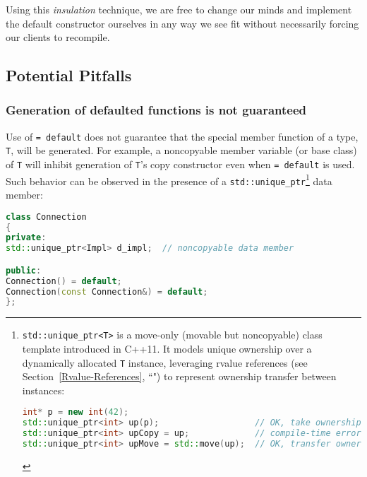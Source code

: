 \noindent Using this \emph{insulation} technique, we are free to change our minds
and implement the default constructor ourselves in any way we see fit
without necessarily forcing our clients to recompile.

\subsection[Potential Pitfalls]{Potential Pitfalls}\label{potential-pitfalls}

\subsubsection[Generation of defaulted functions is not guaranteed]{Generation of defaulted functions is not guaranteed}\label{generation-of-defaulted-functions-is-not-guaranteed}

Use of \texttt{=}~\texttt{default} does not guarantee that the special
member function of a type, \texttt{T}, will be generated. For example, a
noncopyable member variable (or base class) of \texttt{T} will inhibit
generation of \texttt{T}'s copy constructor even when
\texttt{=}~\texttt{default} is used. Such behavior can be observed in
the presence of a \texttt{std::unique\_ptr}{\cprotect\footnote{\texttt{std::unique\_ptr<T>}
is a move-only (movable but noncopyable) class template introduced in
C++11. It models unique ownership over a dynamically allocated
\texttt{T} instance, leveraging rvalue references (see Section~\ref{Rvalue-References}, ``") to represent ownership transfer between instances:

\begin{lstlisting}[language=C++, basicstyle={\ttfamily\footnotesize}]
int* p = new int(42);
std::unique_ptr<int> up(p);                   // OK, take ownership of (ù{\codeincomments{p}}ù).
std::unique_ptr<int> upCopy = up;             // compile-time error
std::unique_ptr<int> upMove = std::move(up);  // OK, transfer ownership.
\end{lstlisting}
}} data member:

\begin{lstlisting}[language=C++]
class Connection
{
private:
std::unique_ptr<Impl> d_impl;  // noncopyable data member

public:
Connection() = default;
Connection(const Connection&) = default;
};
\end{lstlisting}

